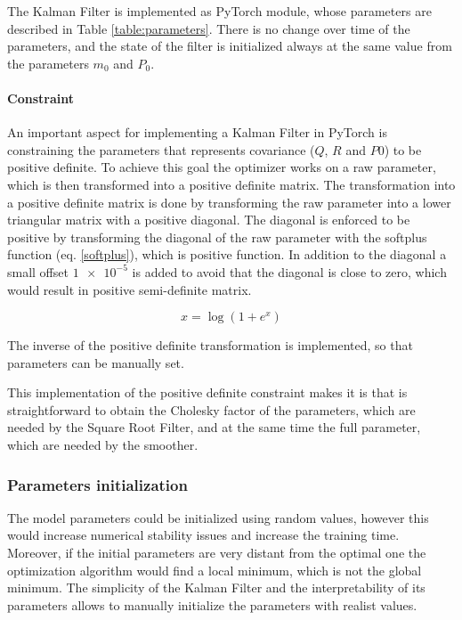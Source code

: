 \documentclass{article}
\begin{document}
The Kalman Filter is implemented as PyTorch module, whose parameters are described in Table \ref{table:parameters}.
There is no change over time of the parameters, and the state of the filter is initialized always at the same value from the parameters $m_0$ and $P_0$.

\paragraph{Constraint}

An important aspect for implementing a Kalman Filter in PyTorch is constraining the parameters that represents covariance ($Q$, $R$ and $P0$) to be positive definite. To achieve this goal the optimizer works on a raw parameter, which is then transformed into a positive definite matrix.
The transformation into a positive definite matrix is done by transforming the raw parameter into a lower triangular matrix with a positive diagonal. The diagonal is enforced to be positive by transforming the diagonal of the raw parameter with the softplus function (eq. \ref{softplus}), which is positive function. In addition to the diagonal a small offset $\num{1e-5}$ is added to avoid that the diagonal is close to zero, which would result in positive semi-definite matrix.

\begin{equation}\label{softplus}
    x = \log (1 + e^{x})
\end{equation}

The inverse of the positive definite transformation is implemented, so that parameters can be manually set.

This implementation of the positive definite constraint makes it is that is straightforward to obtain the Cholesky factor of the parameters, which are needed by the Square Root Filter, and at the same time the full parameter, which are needed by the smoother.

\subsubsection{Parameters initialization}

The model parameters could be initialized using random values, however this would increase numerical stability issues and increase the training time. Moreover, if the initial parameters are very distant from the optimal one the optimization algorithm would find a local minimum, which is not the global minimum.  The simplicity of the Kalman Filter and the interpretability of its parameters allows to manually initialize the parameters with realist values.
\end{document}
